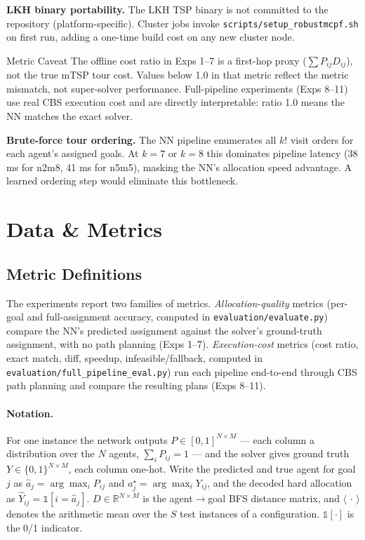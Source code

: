 \documentclass[11pt,a4paper]{article}
\begin{document}
\textbf{LKH binary portability.} The LKH TSP binary is not committed to the repository
(platform-specific). Cluster jobs invoke \texttt{scripts/setup\_robustmcpf.sh} on first run,
adding a one-time build cost on any new cluster node.

\begin{warnbox}{Metric Caveat}
The offline cost ratio in Exps 1--7 is a first-hop proxy ($\sum P_{ij} D_{ij}$), not the
true mTSP tour cost. Values below 1.0 in that metric reflect the metric mismatch, not
super-solver performance. Full-pipeline experiments (Exps 8--11) use real CBS execution cost
and are directly interpretable: ratio 1.0 means the NN matches the exact solver.
\end{warnbox}

\textbf{Brute-force tour ordering.} The NN pipeline enumerates all $k!$ visit orders for each
agent's assigned goals. At $k=7$ or $k=8$ this dominates pipeline latency (38 ms for n2m8,
41 ms for n5m5), masking the NN's allocation speed advantage. A learned ordering step would
eliminate this bottleneck.

\section{Data \& Metrics}

\subsection{Metric Definitions}

The experiments report two families of metrics. \emph{Allocation-quality} metrics (per-goal
and full-assignment accuracy, computed in \texttt{evaluation/evaluate.py}) compare the NN's
predicted assignment against the solver's ground-truth assignment, with no path planning
(Exps 1--7). \emph{Execution-cost} metrics (cost ratio, exact match, diff, speedup,
infeasible/fallback, computed in \texttt{evaluation/full\_pipeline\_eval.py}) run each pipeline
end-to-end through CBS path planning and compare the resulting plans (Exps 8--11).

\paragraph{Notation.} For one instance the network outputs $P\in[0,1]^{N\times M}$ --- each
column a distribution over the $N$ agents, $\sum_i P_{ij}=1$ --- and the solver gives ground
truth $Y\in\{0,1\}^{N\times M}$, each column one-hot. Write the predicted and true agent for
goal $j$ as $\hat a_j=\arg\max_i P_{ij}$ and $a^\star_j=\arg\max_i Y_{ij}$, and the decoded hard
allocation as $\hat Y_{ij}=\mathbb{1}[i=\hat a_j]$. $D\in\mathbb{R}^{N\times M}$ is the
agent$\to$goal BFS distance matrix, and $\langle\,\cdot\,\rangle$ denotes the arithmetic mean
over the $S$ test instances of a configuration. $\mathbb{1}[\cdot]$ is the 0/1 indicator.
\end{document}
